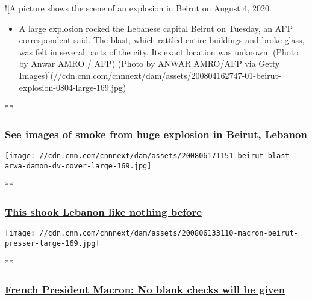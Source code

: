 !{[}A picture shows the scene of an explosion in Beirut on August 4,
2020.

\begin{itemize}
\tightlist
\item
  A large explosion rocked the Lebanese capital Beirut on Tuesday, an
  AFP correspondent said. The blast, which rattled entire buildings and
  broke glass, was felt in several parts of the city. Its exact location
  was unknown. (Photo by Anwar AMRO / AFP) (Photo by ANWAR AMRO/AFP via
  Getty
  Images){]}(//cdn.cnn.com/cnnnext/dam/assets/200804162747-01-beirut-explosion-0804-large-169.jpg)
\end{itemize}

**

\hypertarget{see-images-of-smoke-from-huge-explosion-in-beirut-lebanon}{%
\subsubsection{\texorpdfstring{\href{/videos/world/2020/08/04/beirut-lebanon-explosion-intl-ldn-vpx.cnn/video/playlists/beirut-explosion/}{See
images of smoke from huge explosion in Beirut,
Lebanon}}{See images of smoke from huge explosion in Beirut, Lebanon}}\label{see-images-of-smoke-from-huge-explosion-in-beirut-lebanon}}

\href{/videos/world/2020/08/06/beirut-explosion-arwa-damon-lon-orig.cnn/video/playlists/beirut-explosion/}{}

\texttt{[image: //cdn.cnn.com/cnnnext/dam/assets/200806171151-beirut-blast-arwa-damon-dv-cover-large-169.jpg]}

**

\hypertarget{this-shook-lebanon-like-nothing-before}{%
\subsubsection{\texorpdfstring{\href{/videos/world/2020/08/06/beirut-explosion-arwa-damon-lon-orig.cnn/video/playlists/beirut-explosion/}{This
shook Lebanon like nothing
before}}{This shook Lebanon like nothing before}}\label{this-shook-lebanon-like-nothing-before}}

\href{/videos/world/2020/08/06/emmanuel-macron-lebanon-leaders-blank-check-sot-vpx.afptv/video/playlists/beirut-explosion/}{}

\texttt{[image: //cdn.cnn.com/cnnnext/dam/assets/200806133110-macron-beirut-presser-large-169.jpg]}

**

\hypertarget{french-president-macron-no-blank-checks-will-be-given}{%
\subsubsection{\texorpdfstring{\href{/videos/world/2020/08/06/emmanuel-macron-lebanon-leaders-blank-check-sot-vpx.afptv/video/playlists/beirut-explosion/}{French
President Macron: No blank checks will be
given}}{French President Macron: No blank checks will be given}}\label{french-president-macron-no-blank-checks-will-be-given}}

